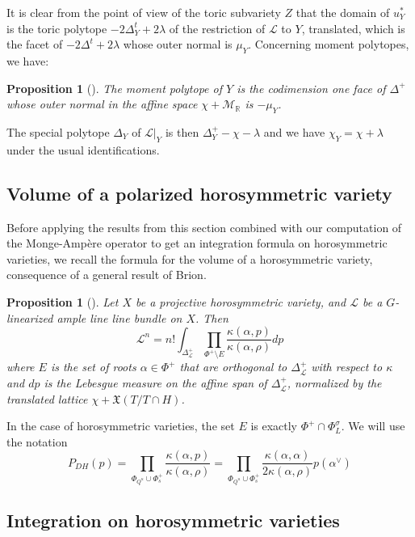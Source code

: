 \documentclass{amsart}
\newtheorem{prop}[thm]{Proposition}
\theoremstyle{definition}
\begin{document}
It is clear from the point of view of the toric subvariety $Z$ that 
the domain of $u_Y^*$ is the toric polytope $-2\Delta^t_Y+2\lambda$  
of 
the restriction of $\mathcal{L}$ to $Y$, translated, 
which is the facet of 
$-2\Delta^t+2\lambda$ whose outer normal is $\mu_Y$.  
Concerning moment polytopes, we have:

\begin{prop}[{\cite{Bria}}]
\label{prop_moment_facet}
The moment polytope of $Y$ is the codimension one face of $\Delta^+$ whose 
outer normal in the affine space $\chi+\mathcal{M}_{\mathbb{R}}$ is $-\mu_Y$.
\end{prop}

The special polytope $\Delta_Y$ of $\mathcal{L}|_Y$ is then 
$\Delta^+_Y-\chi-\lambda$ 
and we have $\chi_Y=\chi+\lambda$ under the usual identifications.

\subsection{Volume of a polarized horosymmetric variety}

Before applying the results from this section combined with our computation 
of the Monge-Ampère operator to get an integration formula on horosymmetric 
varieties, we recall the formula for the volume of a horosymmetric variety, 
consequence of a general result of Brion. 

\begin{prop}[{\cite[Théorème 4.1]{Bri89}}] 
\label{prop_volume}
Let $X$ be a projective horosymmetric variety, and $\mathcal{L}$ be a $G$-linearized 
ample line line bundle on $X$. Then 
\[
\mathcal{L}^n= n! \int_{\Delta^+_{\mathcal{L}}} 
\prod_{\Phi^+\setminus E}\frac{\kappa(\alpha,p)}{\kappa(\alpha,\rho)} dp 
\]
where $E$ is the set of roots $\alpha\in \Phi^+$ that are orthogonal to  
$\Delta^+_{\mathcal{L}}$ with respect to $\kappa$ and $dp$ is the Lebesgue 
measure on the affine span of $\Delta^+_{\mathcal{L}}$, normalized by the 
translated lattice $\chi+\mathfrak{X}(T/T\cap H)$.
\end{prop}

In the case of horosymmetric varieties, the set $E$ is exactly $\Phi^+\cap \Phi_L^{\sigma}$. 
We will use the notation  
\[
P_{DH}(p)=\prod_{\Phi_{Q^u}\cup \Phi_s^+}\frac{\kappa(\alpha,p)}{\kappa(\alpha,\rho)}
=\prod_{\Phi_{Q^u}\cup \Phi_s^+}\frac{\kappa(\alpha,\alpha)}{2\kappa(\alpha,\rho)} p(\alpha^{\vee})
\]



\subsection{Integration on horosymmetric varieties}
\end{document}
